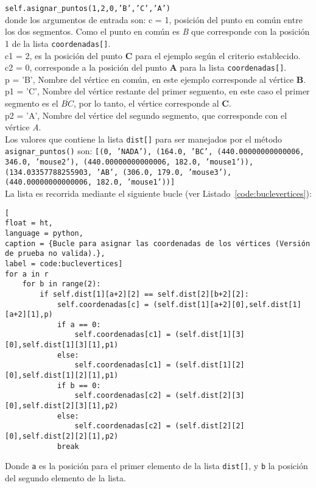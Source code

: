 \texttt{self.asignar\_puntos(1,2,0,'B','C','A')}\\
donde los argumentos de entrada son:
c = 1, posición del punto en común entre los dos segmentos. Como el punto en común es \textit{B} que corresponde con la posición 1 de la lista \texttt{coordenadas[]}.\\
c1 = 2, es la posición del punto \textbf{C} para el ejemplo según el criterio establecido.\\
c2 = 0, corresponde a la posición del punto \textbf{A} para la lista \texttt{coordenadas[]}.\\
p = 'B', Nombre del vértice en común, en este ejemplo corresponde al vértice \textbf{B}.\\
p1 = 'C', Nombre del vértice restante del primer segmento, en este caso el primer segmento es el $\overline{BC}$, por lo tanto, el vértice corresponde al \textbf{C}.\\
p2 = 'A', Nombre del vértice del segundo segmento, que corresponde con el vértice \textit{A}.\\

Los valores que contiene la lista \texttt{dist[]} para ser manejados por el método \texttt{asignar\_puntos()} son:
\texttt{[(0, 'NADA'), (164.0, 'BC', (440.00000000000006, 346.0, 'mouse2'), (440.00000000000006, 182.0, 'mouse1')), (134.03357788255903, 'AB', (306.0, 179.0, 'mouse3'), (440.00000000000006, 182.0, 'mouse1'))]}\\

La lista es recorrida mediante el siguiente bucle (ver Listado~\ref{code:buclevertices}):
\begin{lstlisting}[
float = ht, 
language = python,
caption = {Bucle para asignar las coordenadas de los vértices (Versión de prueba no valida).},
label = code:buclevertices]
for a in r
	for b in range(2):
		if self.dist[1][a+2][2] == self.dist[2][b+2][2]:
			self.coordenadas[c] = (self.dist[1][a+2][0],self.dist[1][a+2][1],p)
			if a == 0:
				self.coordenadas[c1] = (self.dist[1][3][0],self.dist[1][3][1],p1)
			else:
				self.coordenadas[c1] = (self.dist[1][2][0],self.dist[1][2][1],p1)
			if b == 0:
				self.coordenadas[c2] = (self.dist[2][3][0],self.dist[2][3][1],p2)
			else:
				self.coordenadas[c2] = (self.dist[2][2][0],self.dist[2][2][1],p2)
			break
\end{lstlisting}

Donde \texttt{a} es la posición para el primer elemento de la lista \texttt{dist[]}, y \texttt{b} la posición del segundo elemento de la lista.

